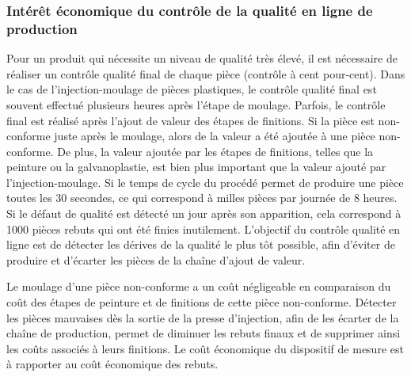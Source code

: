 \subsubsection{Intérêt économique du contrôle de la qualité en ligne de production}
Pour un produit qui nécessite un niveau de qualité très élevé, il est nécessaire de réaliser un contrôle qualité final de chaque pièce (contrôle à cent pour-cent).
Dans le cas de l'injection-moulage de pièces plastiques, le contrôle qualité final est souvent effectué plusieurs heures après l’étape de moulage.
Parfois, le contrôle final est réalisé après l’ajout de valeur des étapes de finitions.  %
Si la pièce est non-conforme juste après le moulage, alors de la valeur a été ajoutée à une pièce non-conforme.
De plus, la valeur ajoutée par les étapes de finitions, telles que la peinture ou la galvanoplastie, est bien plus important que la valeur ajouté par l'injection-moulage.
Si le temps de cycle du procédé permet de produire une pièce toutes les 30 secondes, ce qui correspond à milles pièces par journée de 8 heures.
Si le défaut de qualité est détecté un jour après son apparition, cela correspond à 1000 pièces rebuts qui ont été finies inutilement.
L’objectif du contrôle qualité en ligne est de détecter les dérives de la qualité le plus tôt possible, afin d'éviter de produire et d'écarter les pièces de la chaîne d'ajout de valeur.

Le moulage d'une pièce non-conforme a un coût négligeable en comparaison du coût des étapes de peinture et de finitions de cette pièce non-conforme.
Détecter les pièces mauvaises dès la sortie de la presse d’injection, afin de les écarter de la chaîne de production, permet de diminuer les rebuts finaux et de supprimer ainsi les coûts associés à leurs finitions.
Le coût économique du dispositif de mesure est à rapporter au coût économique des rebuts.


